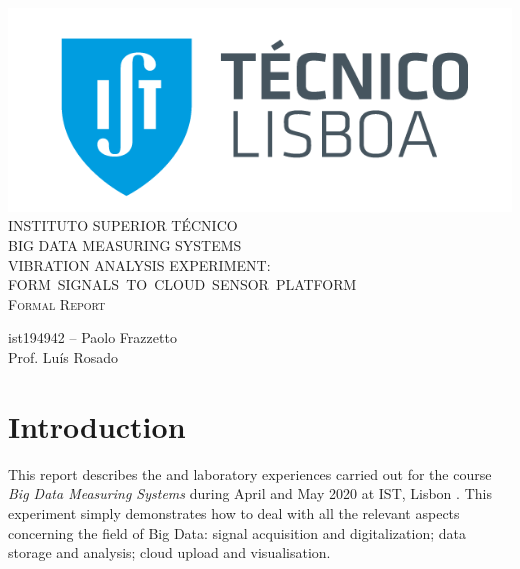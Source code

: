 \documentclass[12pt]{article}
\begin{document}
    \setmainfont[Ligatures=TeX]{ArialB.ttf}

    \begin{titlepage}
        \thispagestyle{title1}
        \flushleft
        \includegraphics[scale = 0.3]{imagens/ist.png}\\[1.5 cm]
        \centering
        \textsc{\fontsize{18}{22}\selectfont INSTITUTO SUPERIOR TÉCNICO}\\[2 cm]
        \textsc{\fontsize{22}{25}\selectfont BIG DATA MEASURING SYSTEMS}\\[3 cm]
        \textsc{\fontsize{22}{25}\selectfont VIBRATION ANALYSIS EXPERIMENT:}\\[0.1 cm]
        \mbox{\textsc{\fontsize{22}{25}\selectfont FORM SIGNALS TO CLOUD SENSOR PLATFORM }}\\[3 cm]
        \textsc{\fontsize{28}{34}\selectfont Formal Report}\\[5 cm]
        \begin{minipage}{0.5\textwidth}
            \quad
        \end{minipage}
        \setmainfont[Ligatures=TeX]{Arial.ttf}
        \begin{minipage}{0.49\textwidth}
            ist194942 -- Paolo Frazzetto\\[2cm]
            Prof. Luís Rosado
        \end{minipage}
\end{titlepage}

\setmainfont[Ligatures=TeX]{Times.ttf}

\newpage

\pagestyle{plain}

\section{Introduction}
This report describes the  and  laboratory experiences carried out for the course \emph{Big Data Measuring Systems} during April and May 2020 at IST, Lisbon \cite{1}. This experiment simply demonstrates how to deal with all the relevant aspects concerning the field of Big Data: signal acquisition and digitalization; data storage and analysis; cloud upload and visualisation.
\end{document}
